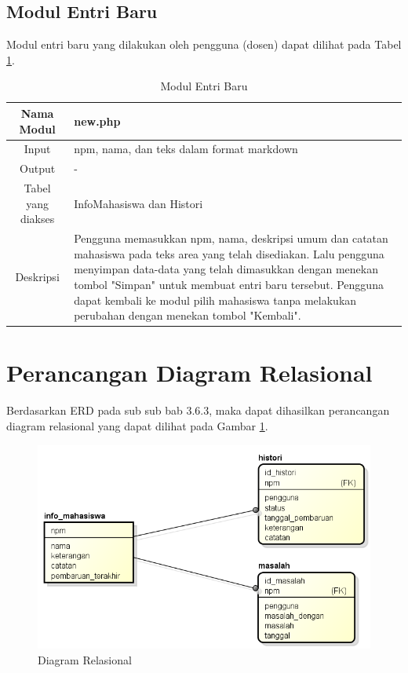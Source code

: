\subsection{Modul Entri Baru}
Modul entri baru yang dilakukan oleh pengguna (dosen) dapat dilihat pada Tabel
\ref{tab:modulentribaru}.

\begin{table}[ht]
\centering
\caption[Tabel Modul Entri Baru]{Modul Entri Baru} 
\label{tab:modulentribaru}
\begin{tabular}{|c|p{10cm}|}
\hline
Nama Modul & new.php\\
\hline
Input & npm, nama, dan teks dalam format markdown\\
\hline
Output & -\\
\hline
Tabel yang diakses & InfoMahasiswa dan Histori\\
\hline
Deskripsi & Pengguna memasukkan npm, nama, deskripsi umum dan catatan mahasiswa pada teks area yang telah disediakan. Lalu pengguna menyimpan data-data yang telah dimasukkan dengan menekan tombol "Simpan" untuk membuat entri baru tersebut. Pengguna dapat kembali ke modul pilih mahasiswa tanpa melakukan perubahan dengan menekan tombol "Kembali".\\
\hline
\end{tabular}
\end{table}

\section{Perancangan Diagram Relasional}
\label{sec:perancangandiagramrelasional}

Berdasarkan ERD pada sub sub bab 3.6.3, maka dapat dihasilkan perancangan diagram relasional yang dapat dilihat pada Gambar \ref{fig:diagramrelasional}.

\begin{figure}[ht]
\centering
\includegraphics[scale=0.9]{Gambar/diagramrelasional.png}
\caption[Diagram Relasional]{Diagram Relasional} 
\label{fig:diagramrelasional}
\end{figure}


